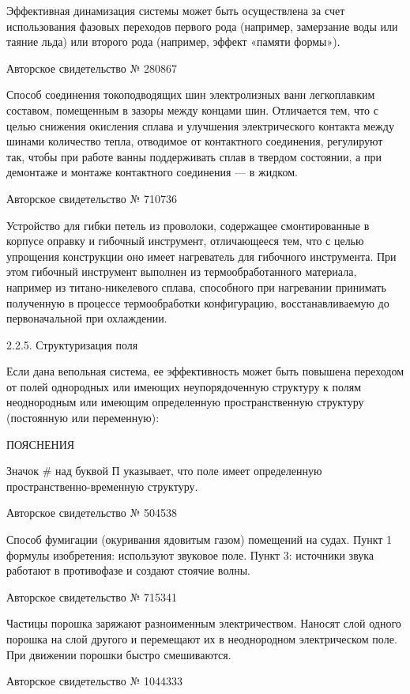 Эффективная  динамизация  системы  может  быть  осуществлена  за  счет
использования  фазовых переходов  первого  рода (например,  замерзание
воды  или таяние  льда)  или второго  рода  (например, эффект  «памяти
формы»).


Авторское свидетельство № 280867

Способ соединения  токоподводящих шин электролизных  ванн легкоплавким
составом, помещенным в зазоры между концами шин. Отличается тем, что с
целью снижения  окисления сплава  и улучшения  электрического контакта
между шинами  количество тепла,  отводимое от  контактного соединения,
регулируют так,  чтобы при работе  ванны поддерживать сплав  в твердом
состоянии,  а  при демонтаже  и  монтаже  контактного соединения  —  в
жидком.


Авторское свидетельство № 710736

Устройство для гибки петель  из проволоки, содержащее смонтированные в
корпусе оправку и  гибочный инструмент, отличающееся тем,  что с целью
упрощения конструкции оно имеет нагреватель для гибочного инструмента.
При этом гибочный инструмент выполнен из термообработанного материала,
например  из  титано-никелевого   сплава,  способного  при  нагревании
принимать   полученную   в   процессе   термообработки   конфигурацию,
восстанавливаемую до первоначальной при охлаждении.


2.2.5. Структуризация поля

Если  дана вепольная  система,  ее эффективность  может быть  повышена
переходом от полей однородных  или имеющих неупорядоченную структуру к
полям неоднородным или имеющим определенную пространственную структуру
(постоянную или переменную):


ПОЯСНЕНИЯ

Значок  #  над  буквой  П   указывает,  что  поле  имеет  определенную
пространственно-временную структуру.


Авторское свидетельство № 504538

Способ фумигации (окуривания ядовитым газом) помещений на судах. Пункт
1 формулы  изобретения: используют  звуковое поле. Пункт  3: источники
звука работают в противофазе и создают стоячие волны.


Авторское свидетельство № 715341

Частицы  порошка заряжают  разноименным  электричеством. Наносят  слой
одного  порошка  на  слой  другого  и  перемещают  их  в  неоднородном
электрическом поле. При движении порошки быстро смешиваются.


Авторское свидетельство № 1044333

